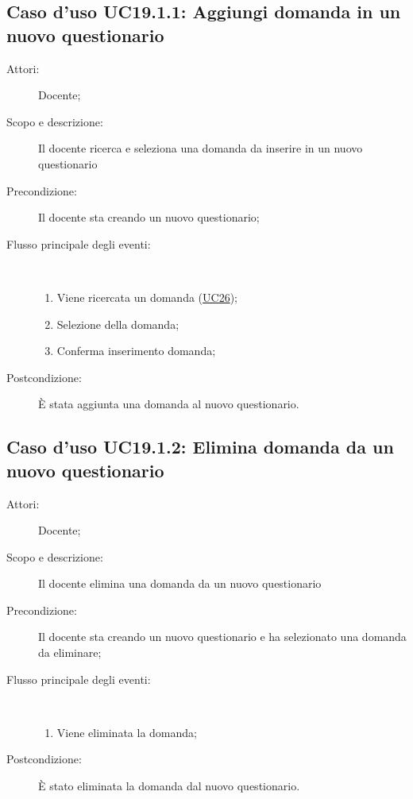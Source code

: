 \subsection{Caso d'uso UC19.1.1: Aggiungi domanda in un nuovo questionario }\begin{description}
	\item[Attori:] Docente;
	\item[Scopo e descrizione:] Il docente ricerca e seleziona una domanda da inserire in un nuovo questionario
	\item[Precondizione:] Il docente sta creando un nuovo questionario;
	
	\item[Flusso principale degli eventi:] \ 
	\begin{enumerate}
		\item Viene ricercata un domanda (\hyperlink{UC26}{UC26});
		\item Selezione della domanda;
		\item Conferma inserimento domanda;
		
	\end{enumerate}
	\item[Postcondizione:] È stata aggiunta una domanda al nuovo questionario.
\end{description}
\hypertarget{UC19.1.2}{}
\subsection{Caso d'uso UC19.1.2: Elimina domanda da un nuovo questionario}\begin{description}
	\item[Attori:] Docente;
	\item[Scopo e descrizione:] Il docente elimina una domanda da un nuovo questionario
	\item[Precondizione:] Il docente sta creando un nuovo questionario e ha selezionato una domanda da eliminare;
	
	\item[Flusso principale degli eventi:] \ 
	\begin{enumerate}
		\item Viene eliminata la domanda;
		
	\end{enumerate}
	\item[Postcondizione:] È stato eliminata la domanda dal nuovo questionario.
\end{description}
\hypertarget{UC19.1.3}{}
